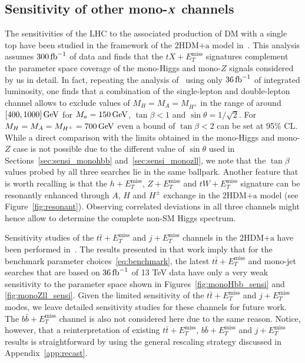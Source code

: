 \documentclass[a4paper, 11pt,notoc]{article}
\newcommand{\MET}{\ensuremath{E_T^\mathrm{miss}}\xspace}
\newcommand{\ma}{\ensuremath{M_{a}}\xspace}
\newcommand{\mHc}{\ensuremath{M_{H^{\pm}}}\xspace}
\newcommand{\hdma}{\ensuremath{\textrm{2HDM+a}}\xspace}
\def\bm#1{\mbox{\boldmath$#1$\unboldmath}}
\begin{document}
\subsection[Sensitivity of other mono-$X$ channels]{Sensitivity of other mono-$\bm{X}$ channels}
\label{sec:sensi_others}

The sensitivities of the LHC to the associated production of DM with a single top have been  studied in the framework of the \hdma model in~\cite{Pani:2017qyd}. This analysis assumes $300 \, {\rm fb}^{-1}$ of data and finds that the $t X + \MET$ signatures complement the parameter space coverage of the mono-Higgs and  mono-$Z$ signals considered by us in detail.   In fact, repeating  the analysis of~\cite{Pani:2017qyd} using only   $36 \, {\rm fb}^{-1}$ of integrated luminosity, one finds that a combination of the single-lepton and double-lepton channel allows to exclude values of $M_H = M_A = \mHc$ in the range of around $[400, 1000 ] \, {\rm GeV}$ for $\ma = 150 \, {\rm GeV}$, $\tan \beta < 1$ and $\sin \theta = 1/\sqrt{2}$. For $M_H = M_A = \mHc = 700 \, {\rm GeV}$ even a bound of $\tan \beta < 2$ can be set at 95\% CL. While a direct comparison with the limits obtained in the mono-Higgs and mono-$Z$ case is not possible due to the different value of $\sin \theta$ used in Sections~\ref{sec:sensi_monohbb} and~\ref{sec:sensi_monozll},  we note that the $\tan \beta$ values probed by all three searches  lie in the same ballpark. Another feature that is worth recalling is that the $h+\MET$, $Z+\MET$ and $tW+\MET$ signature can be resonantly enhanced through $A$, $H$ and $H^\pm$ exchange in the \hdma model (see Figure~\ref{fig:resonant}). Observing correlated deviations in all three channels might hence allow to determine the complete non-SM Higgs spectrum. 

Sensitivity studies of the $t \bar t + \MET$ and $j + \MET$ channels in the \hdma have been performed in~\cite{Bauer:2017ota}. The results presented in that work imply that for the benchmark parameter choices~\eqref{eq:benchmark}, the latest  $t \bar t + \MET$ and  mono-jet searches that are based on $36 \, {\rm fb}^{-1}$ of 13 TeV data have  only a very weak sensitivity to the parameter space shown in Figures~\ref{fig:monoHbb_sensi} and \ref{fig:monoZll_sensi}. Given the limited sensitivity of the $t \bar t + \MET$ and $j + \MET$  modes, we leave detailed sensitivity studies for these channels for future work. The $b \bar b + \MET$ channel is also not considered here due to the same reason. Notice, however, that a reinterpretation of existing $t \bar t + \MET$, $b \bar b + \MET$ and $j + \MET$ results is straightforward by using the general rescaling strategy discussed in Appendix~\ref{app:recast}. 
\end{document}
